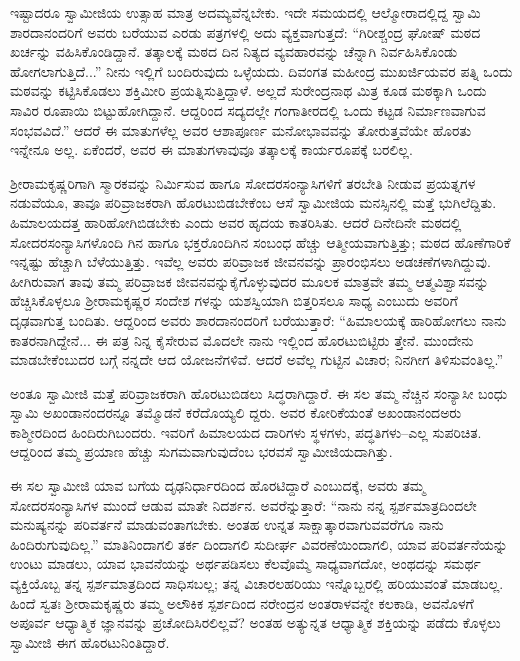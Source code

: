 ಇಷ್ಟಾದರೂ ಸ್ವಾಮೀಜಿಯ ಉತ್ಸಾಹ ಮಾತ್ರ ಅದಮ್ಯವೆನ್ನಬೇಕು. ಇದೇ ಸಮಯದಲ್ಲಿ ಆಲ್ಮೋರಾದಲ್ಲಿದ್ದ ಸ್ವಾಮಿ ಶಾರದಾನಂದರಿಗೆ ಅವರು ಬರೆಯುವ ಎರಡು ಪತ್ರಗಳಲ್ಲಿ ಅದು ವ್ಯಕ್ತವಾಗುತ್ತದೆ: “ಗಿರೀಶ್ಚಂದ್ರ ಘೋಷ್ ಮಠದ ಖರ್ಚನ್ನು ವಹಿಸಿಕೊಂಡಿದ್ದಾನೆ. ತತ್ಕಾಲಕ್ಕೆ ಮಠದ ದಿನ ನಿತ್ಯದ ವ್ಯವಹಾರವನ್ನು ಚೆನ್ನಾಗಿ ನಿರ್ವಹಿಸಿಕೊಂಡು ಹೋಗಲಾಗುತ್ತಿದೆ...” ನೀನು ಇಲ್ಲಿಗೆ ಬಂದಿರುವುದು ಒಳ್ಳೆಯದು. ದಿವಂಗತ ಮಹೀಂದ್ರ ಮುಖರ್ಜಿಯವರ ಪತ್ನಿ ಒಂದು ಮಠವನ್ನು ಕಟ್ಟಿಸಿಕೊಡಲು ಶಕ್ತಿಮೀರಿ ಪ್ರಯತ್ನಿಸುತ್ತಿದ್ದಾಳೆ. ಅಲ್ಲದೆ ಸುರೇಂದ್ರನಾಥ ಮಿತ್ರ ಕೂಡ ಮಠಕ್ಕಾಗಿ ಒಂದು ಸಾವಿರ ರೂಪಾಯಿ ಬಿಟ್ಟುಹೋಗಿದ್ದಾನೆ. ಆದ್ದರಿಂದ ಸದ್ಯದಲ್ಲೇ ಗಂಗಾತೀರದಲ್ಲಿ ಒಂದು ಕಟ್ಟಡ ನಿರ್ಮಾಣವಾಗುವ ಸಂಭವವಿದೆ.” ಆದರೆ ಈ ಮಾತುಗಳೆಲ್ಲ ಅವರ ಆಶಾಪೂರ್ಣ ಮನೋಭಾವವನ್ನು ತೋರುತ್ತವೆಯೇ ಹೊರತು ಇನ್ನೇನೂ ಅಲ್ಲ. ಏಕೆಂದರೆ, ಅವರ ಈ ಮಾತುಗಳಾವುವೂ ತತ್ಕಾಲಕ್ಕೆ ಕಾರ್ಯರೂಪಕ್ಕೆ ಬರಲಿಲ್ಲ.

ಶ್ರೀರಾಮಕೃಷ್ಣರಿಗಾಗಿ ಸ್ಮಾರಕವನ್ನು ನಿರ್ಮಿಸುವ ಹಾಗೂ ಸೋದರಸಂನ್ಯಾಸಿಗಳಿಗೆ ತರಬೇತಿ ನೀಡುವ ಪ್ರಯತ್ನಗಳ ನಡುವೆಯೂ, ತಾವೂ ಪರಿವ್ರಾಜಕರಾಗಿ ಹೊರಟುಬಿಡಬೇಕೆಂಬ ಆಸೆ ಸ್ವಾಮೀಜಿಯ ಮನಸ್ಸಿನಲ್ಲಿ ಮತ್ತೆ ಭುಗಿಲೆದ್ದಿತು. ಹಿಮಾಲಯದತ್ತ ಹಾರಿಹೋಗಿಬಿಡಬೇಕು ಎಂದು ಅವರ ಹೃದಯ ಕಾತರಿಸಿತು. ಆದರೆ ದಿನೇದಿನೇ ಮಠದಲ್ಲಿ ಸೋದರಸಂನ್ಯಾಸಿಗಳೊಂದಿ ಗಿನ ಹಾಗೂ ಭಕ್ತರೊಂದಿಗಿನ ಸಂಬಂಧ ಹೆಚ್ಚು ಆತ್ಮೀಯವಾಗುತ್ತಿತ್ತು; ಮಠದ ಹೊಣೆಗಾರಿಕೆ ಇನ್ನಷ್ಟು ಹೆಚ್ಚಾಗಿ ಬೆಳೆಯುತ್ತಿತ್ತು. ಇವೆಲ್ಲ ಅವರು ಪರಿವ್ರಾಜಕ ಜೀವನವನ್ನು ಪ್ರಾರಂಭಿಸಲು ಅಡಚಣೆಗಳಾಗಿದ್ದುವು. ಹೀಗಿರುವಾಗ ತಾವು ತಮ್ಮ ಪರಿವ್ರಾಜಕ ಜೀವನವನ್ನುಕೈಗೊಳ್ಳುವುದರ ಮೂಲಕ ಮಾತ್ರವೇ ತಮ್ಮ ಆತ್ಮವಿಶ್ವಾಸವನ್ನು ಹೆಚ್ಚಿಸಿಕೊಳ್ಳಲೂ ಶ್ರೀರಾಮಕೃಷ್ಣರ ಸಂದೇಶ ಗಳನ್ನು ಯಶಸ್ವಿಯಾಗಿ ಬಿತ್ತರಿಸಲೂ ಸಾಧ್ಯ ಎಂಬುದು ಅವರಿಗೆ ದೃಢವಾಗುತ್ತ ಬಂದಿತು. ಆದ್ದರಿಂದ ಅವರು ಶಾರದಾನಂದರಿಗೆ ಬರೆಯುತ್ತಾರೆ: “ಹಿಮಾಲಯಕ್ಕೆ ಹಾರಿಹೋಗಲು ನಾನು ಕಾತರನಾಗಿದ್ದೇನೆ... ಈ ಪತ್ರ ನಿನ್ನ ಕೈಸೇರುವ ಮೊದಲೇ ನಾನು ಇಲ್ಲಿಂದ ಹೊರಟುಬಿಟ್ಟಿರು ತ್ತೇನೆ. ಮುಂದೇನು ಮಾಡಬೇಕೆಂಬುದರ ಬಗ್ಗೆ ನನ್ನದೇ ಆದ ಯೋಜನೆಗಳಿವೆ. ಆದರೆ ಅವೆಲ್ಲ ಗುಟ್ಟಿನ ವಿಚಾರ; ನಿನಗೀಗ ತಿಳಿಸುವಂತಿಲ್ಲ.”

ಅಂತೂ ಸ್ವಾಮೀಜಿ ಮತ್ತೆ ಪರಿವ್ರಾಜಕರಾಗಿ ಹೊರಟುಬಿಡಲು ಸಿದ್ಧರಾಗಿದ್ದಾರೆ. ಈ ಸಲ ತಮ್ಮ ನೆಚ್ಚಿನ ಸಂನ್ಯಾಸೀ ಬಂಧು ಸ್ವಾಮಿ ಅಖಂಡಾನಂದರನ್ನೂ ತಮ್ಮೊಡನೆ ಕರೆದೊಯ್ಯಲಿ ದ್ದರು. ಅವರ ಕೋರಿಕೆಯಂತೆ ಅಖಂಡಾನಂದಅರು ಕಾಶ್ಮೀರದಿಂದ ಹಿಂದಿರುಗಿಬಂದರು. ಇವರಿಗೆ ಹಿಮಾಲಯದ ದಾರಿಗಳು ಸ್ಥಳಗಳು, ಪದ್ಧತಿಗಳು–ಎಲ್ಲ ಸುಪರಿಚಿತ. ಆದ್ದರಿಂದ ತಮ್ಮ ಪ್ರಯಾಣ ಹೆಚ್ಚು ಸುಗಮವಾಗುವುದೆಂಬ ಭರವಸೆ ಸ್ವಾಮೀಜಿಯದಾಗಿತ್ತು.

ಈ ಸಲ ಸ್ವಾಮೀಜಿ ಯಾವ ಬಗೆಯ ದೃಢನಿರ್ಧಾರದಿಂದ ಹೊರಟಿದ್ದಾರೆ ಎಂಬುದಕ್ಕೆ, ಅವರು ತಮ್ಮ ಸೋದರಸಂನ್ಯಾಸಿಗಳ ಮುಂದೆ ಆಡುವ ಮಾತೇ ನಿದರ್ಶನ. ಅವರೆನ್ನುತ್ತಾರೆ: “ನಾನು ನನ್ನ ಸ್ಪರ್ಶಮಾತ್ರದಿಂದಲೇ ಮನುಷ್ಯನನ್ನು ಪರಿವರ್ತನೆ ಮಾಡುವಂತಾಗಬೇಕು. ಅಂತಹ ಉನ್ನತ ಸಾಕ್ಷಾತ್ಕಾರವಾಗುವವರೆಗೂ ನಾನು ಹಿಂದಿರುಗುವುದಿಲ್ಲ.” ಮಾತಿನಿಂದಾಗಲಿ ತರ್ಕ ದಿಂದಾಗಲಿ ಸುದೀರ್ಘ ವಿವರಣೆಯಿಂದಾಗಲಿ, ಯಾವ ಪರಿವರ್ತನೆಯನ್ನು ಉಂಟು ಮಾಡಲು, ಯಾವ ಭಾವನೆಯನ್ನು ಅರ್ಥಪಡಿಸಲು ಕೆಲವೊಮ್ಮೆ ಸಾಧ್ಯವಾಗದೋ, ಅಂಥದನ್ನು ಸಮರ್ಥ ವ್ಯಕ್ತಿಯೊಬ್ಬ ತನ್ನ ಸ್ಪರ್ಶಮಾತ್ರದಿಂದ ಸಾಧಿಸಬಲ್ಲ; ತನ್ನ ವಿಚಾರಲಹರಿಯು ಇನ್ನೊಬ್ಬರಲ್ಲಿ ಹರಿಯುವಂತೆ ಮಾಡಬಲ್ಲ. ಹಿಂದೆ ಸ್ವತಃ ಶ್ರೀರಾಮಕೃಷ್ಣರು ತಮ್ಮ ಅಲೌಕಿಕ ಸ್ಪರ್ಶದಿಂದ ನರೇಂದ್ರನ ಅಂತರಾಳವನ್ನೇ ಕಲಕಾಡಿ, ಅವನೊಳಗೆ ಅಪೂರ್ವ ಆಧ್ಯಾತ್ಮಿಕ ಜ್ಞಾನವನ್ನು ಪ್ರಚೋದಿಸಿರಲಿಲ್ಲವೆ? ಅಂತಹ ಅತ್ಯುನ್ನತ ಆಧ್ಯಾತ್ಮಿಕ ಶಕ್ತಿಯನ್ನು ಪಡೆದು ಕೊಳ್ಳಲು ಸ್ವಾಮೀಜಿ ಈಗ ಹೊರಟುನಿಂತಿದ್ದಾರೆ.

